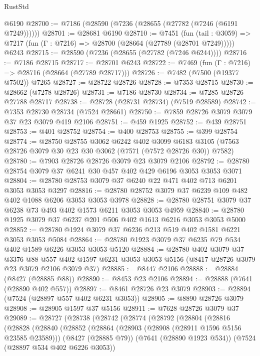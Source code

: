 \begin{lexlean}{RustStd}
\begin{coremodule}
{\begin{coremodule}
{{{{{{{{{{{{{{{{{{{{{{{{{{{{{{{{    @6190
@28700 := @7186 (@28590 (@7236 (@28655 (@27782 (@7246 (@6191 @7249))))))
@28701 := @28681 @6190
@28710 := @7451
    (fun (tail : @3059) => @7217 (fun (Γ : @7216) => @28700 (@28664 (@27789 (@28701 @7249)))))
    @6243
@28715 := @28590 (@7236 (@28655 (@27782 (@7246 @6244))))
@28716 := @7186 @28715
@28717 := @28701 @6243
@28722 := @7469 (fun (Γ : @7216) => @28716 (@28664 (@27789 @28717)))
@28726 := @7482 (@7500 (@19377 @7502)) @7265
@28727 := @28722 @28726
@28728 := @7353 @28715
@28730 := @28662 (@7278 @28726)
@28731 := @7186 @28730
@28734 := @7285 @28726 @27788 @28717
@28738 := @28728 (@28731 @28734) (@7519 @28589)
@28742 := @7353 @28730 @28734 (@7524 @28661)
@28750 := @7859 @28726 @3079 @3079 @37 @23 @3079 @419 @2106
@28751 := @459 @1925
@28752 := @439 @28751
@28753 := @401 @28752
@28754 := @400 @28753
@28755 := @399 @28754
@28774 := @28750
    @28755
    @3062
    @6242
    @402
    @3099
    @6183
    @3105
    (@7563 @28726 @3079 @30 @23 @30 @3062 (@7571 (@7572 @28726 @30)) @7582)
@28780 := @7903 @28726 @28726 @3079 @23 @3079 @2106
@28792 := @28780 @28754 @3079 @37 @6241 @30 @457 @402 @429 @6196 @3053 @3053 @3071
@28804 := @28780 @28753 @3079 @37 @6240 @22 @471 @402 @713 @6201 @3053 @3053 @3297
@28816 := @28780 @28752 @3079 @37 @6239 @109 @482 @402 @1088 @6206 @3053 @3053 @3978
@28828 := @28780 @28751 @3079 @37 @6238 @73 @493 @402 @1573 @6211 @3053 @3053 @4959
@28840 := @28780 @1925 @3079 @37 @6237 @201 @506 @402 @1613 @6216 @3053 @3053 @5000
@28852 := @28780 @1924 @3079 @37 @6236 @213 @519 @402 @1581 @6221 @3053 @3053 @5084
@28864 := @28780 @1923 @3079 @37 @6235 @79 @534 @402 @1589 @6226 @3053 @3053 @5120
@28884 := @28780
    @402
    @3079
    @37
    @3376
    @88
    @557
    @402
    @1597
    @6231
    @3053
    @3053
    @5156
    (@8417 @28726 @3079 @23 @3079 @2106 @3079 @37)
@28885 := @8447 @2106
@28888 := @28884 (@8427 (@28885 @88))
@28890 := @8453 @23 @2106
@28894 := @28888 (@7641 (@28890 @402 @557))
@28897 := @8461 @28726 @23 @3079
@28903 := @28894 (@7524 (@28897 @557 @402 @6231 @3053))
@28905 := @8890 @28726 @3079
@28908 := @28905 @1597 @37 @5156
@28911 := @7628 @28726 @3079 @37
@29089 := @28727
    (@28738
      (@28742
        (@28774
          (@28792
            (@28804
              (@28816
                (@28828
                  (@28840
                    (@28852
                      (@28864
                        (@28903 (@28908 (@28911 @1596 @5156 @23585 @23589)))
                        (@8427 (@28885 @79))
                        (@7641 (@28890 @1923 @534))
                        (@7524 (@28897 @534 @402 @6226 @3053))
}}}}}}}}}}}}}}}}}}}}}}}}}}}}}}}}
\end{coremodule}}
\end{coremodule}
\end{lexlean}
